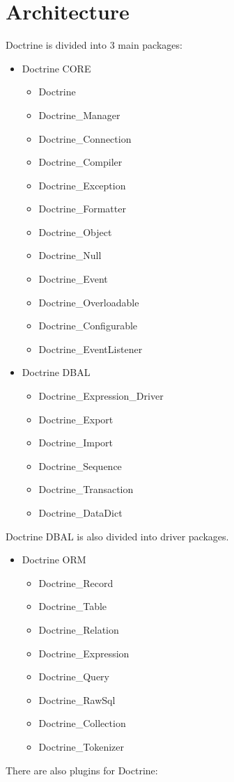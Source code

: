 \documentclass[11pt,a4paper]{report}
\begin{document}
\section{Architecture}
Doctrine is divided into 3 main packages:

\begin{itemize}
\item{Doctrine CORE}
\begin{itemize}
\item{Doctrine}
\item{Doctrine\_Manager}
\item{Doctrine\_Connection}
\item{Doctrine\_Compiler}
\item{Doctrine\_Exception}
\item{Doctrine\_Formatter}
\item{Doctrine\_Object}
\item{Doctrine\_Null}
\item{Doctrine\_Event}
\item{Doctrine\_Overloadable}
\item{Doctrine\_Configurable}
\item{Doctrine\_EventListener}
\end{itemize}
\end{itemize}
\begin{itemize}
\item{Doctrine DBAL}
\begin{itemize}
\item{Doctrine\_Expression\_Driver}
\item{Doctrine\_Export}
\item{Doctrine\_Import}
\item{Doctrine\_Sequence}
\item{Doctrine\_Transaction}
\item{Doctrine\_DataDict}
\end{itemize}
\end{itemize}
Doctrine DBAL is also divided into driver packages.

\begin{itemize}
\item{Doctrine ORM}
\begin{itemize}
\item{Doctrine\_Record}
\item{Doctrine\_Table}
\item{Doctrine\_Relation}
\item{Doctrine\_Expression}
\item{Doctrine\_Query}
\item{Doctrine\_RawSql}
\item{Doctrine\_Collection}
\item{Doctrine\_Tokenizer}
\end{itemize}
\end{itemize}
There are also plugins for Doctrine:
\end{document}
